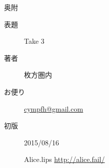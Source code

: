 
\vspace*{110mm}

\begin{flushright}
\begin{minipage}{70mm}
\begin{itembox}{ 奥附 }
  \begin{description}
    \item[表題] Take 3
    \item[著者] 枚方圏内
    \item[お便り] \url{cympfh@gmail.com}
    \item[初版] 2015/08/16
    \item[] \hspace*{-10pt} Alice.lips \url{http://alice.fail/}
  \end{description}
\end{itembox}
\end{minipage}
\end{flushright}
